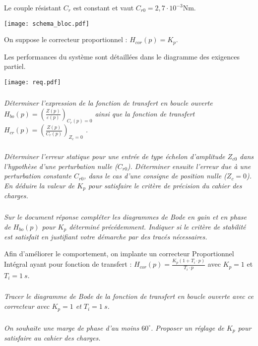 \begin{multicols}{2}
Le couple résistant $C_r$ est constant et vaut $C_{r0} = 2,7 \cdot 10^{-3} \text{Nm}$.



\begin{center}
\texttt{[image: schema\_bloc.pdf]}
\end{center}

On suppose le correcteur proportionnel : $H_{cor}(p)=K_p$.

Les performances du système sont détaillées dans le diagramme des exigences partiel.%


	\begin{center}
			\texttt{[image: req.pdf]}
    \end{center}


\subparagraph{}\textit{Déterminer l'expression de la fonction de transfert en boucle ouverte $H_{bo}(p)=\left(\frac{Z(p)}{\varepsilon(p)}\right)_{C_r(p)=0}$ ainsi que la fonction de transfert $H_{cr}(p)=\left(\frac{Z(p)}{C_r(p)}\right)_{Z_c=0}$
.}

\subparagraph{}\textit{Déterminer l'erreur statique pour une entrée de type échelon d'amplitude $Z_{c0}$ dans l'hypothèse d'une perturbation nulle ($C_{r0}$). Déterminer ensuite l'erreur due à une perturbation constante $C_{r0}$, dans le cas d'une
consigne de position nulle ($Z_c=0$). En déduire la valeur de $K_p$ pour satisfaire le critère de précision du cahier des charges.}


\subparagraph{}\textit{Sur le document réponse %
compléter les diagrammes de Bode en gain et en phase de $H_{bo}(p)$ pour $K_p$ déterminé précédemment. Indiquer si le critère de stabilité est satisfait en justifiant votre démarche par des tracés nécessaires.}

Afin d'améliorer le comportement, on implante un correcteur Proportionnel Intégral ayant pour fonction de transfert : $H_{cor}(p)=\frac{K_p\left(1+T_i\cdot p\right)}{T_i\cdot p}$ avec $K_p=1$ et $T_i = \SI{1}{s}$.

\subparagraph{}\textit{Tracer le diagramme de Bode de la fonction de transfert en boucle ouverte avec ce correcteur avec $K_p=1$ et $T_i = \SI{1}{s}$.}%

\subparagraph{}\textit{On souhaite une marge de phase d'au moins $60^{\circ}$. Proposer un réglage de $K_p$ pour satisfaire au cahier des charges.}%


\end{multicols}
